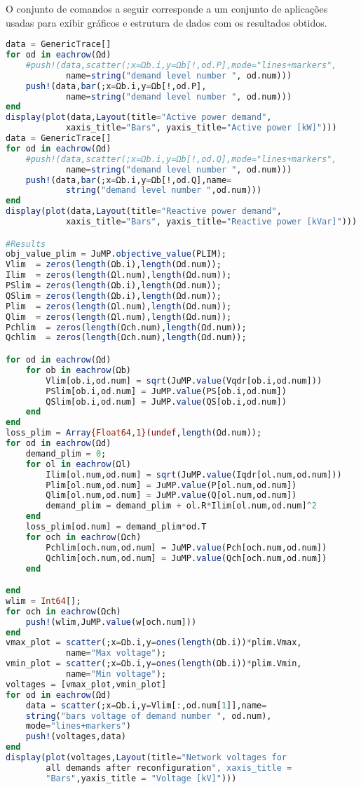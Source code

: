 O conjunto de comandos a seguir corresponde a um conjunto de aplicações usadas para exibir gráficos e estrutura de dados com os resultados obtidos.

\begin{lstlisting}[language = Julia, firstnumber = 137]
data = GenericTrace[]
for od in eachrow(Ωd)
    #push!(data,scatter(;x=Ωb.i,y=Ωb[!,od.P],mode="lines+markers",
            name=string("demand level number ", od.num)))
    push!(data,bar(;x=Ωb.i,y=Ωb[!,od.P],
            name=string("demand level number ", od.num)))
end
display(plot(data,Layout(title="Active power demand", 
            xaxis_title="Bars", yaxis_title="Active power [kW]")))
data = GenericTrace[]
for od in eachrow(Ωd)
    #push!(data,scatter(;x=Ωb.i,y=Ωb[!,od.Q],mode="lines+markers",
            name=string("demand level number ", od.num)))
    push!(data,bar(;x=Ωb.i,y=Ωb[!,od.Q],name=
            string("demand level number ",od.num)))
end
display(plot(data,Layout(title="Reactive power demand", 
            xaxis_title="Bars", yaxis_title="Reactive power [kVar]")))

#Results
obj_value_plim = JuMP.objective_value(PLIM);
Vlim  = zeros(length(Ωb.i),length(Ωd.num));   
Ilim  = zeros(length(Ωl.num),length(Ωd.num));
PSlim = zeros(length(Ωb.i),length(Ωd.num));   
QSlim = zeros(length(Ωb.i),length(Ωd.num));
Plim  = zeros(length(Ωl.num),length(Ωd.num)); 
Qlim  = zeros(length(Ωl.num),length(Ωd.num));
Pchlim  = zeros(length(Ωch.num),length(Ωd.num)); 
Qchlim  = zeros(length(Ωch.num),length(Ωd.num));

for od in eachrow(Ωd)    
    for ob in eachrow(Ωb)
        Vlim[ob.i,od.num] = sqrt(JuMP.value(Vqdr[ob.i,od.num]))
        PSlim[ob.i,od.num] = JuMP.value(PS[ob.i,od.num])
        QSlim[ob.i,od.num] = JuMP.value(QS[ob.i,od.num])
    end
end
loss_plim = Array{Float64,1}(undef,length(Ωd.num));
for od in eachrow(Ωd)
    demand_plim = 0;
    for ol in eachrow(Ωl)
        Ilim[ol.num,od.num] = sqrt(JuMP.value(Iqdr[ol.num,od.num]))
        Plim[ol.num,od.num] = JuMP.value(P[ol.num,od.num])
        Qlim[ol.num,od.num] = JuMP.value(Q[ol.num,od.num])
        demand_plim = demand_plim + ol.R*Ilim[ol.num,od.num]^2
    end
    loss_plim[od.num] = demand_plim*od.T
    for och in eachrow(Ωch)
        Pchlim[och.num,od.num] = JuMP.value(Pch[och.num,od.num])
        Qchlim[och.num,od.num] = JuMP.value(Qch[och.num,od.num])
    end

end
wlim = Int64[];
for och in eachrow(Ωch)
    push!(wlim,JuMP.value(w[och.num]))
end
vmax_plot = scatter(;x=Ωb.i,y=ones(length(Ωb.i))*plim.Vmax,
            name="Max voltage");
vmin_plot = scatter(;x=Ωb.i,y=ones(length(Ωb.i))*plim.Vmin,
            name="Min voltage");
voltages = [vmax_plot,vmin_plot]
for od in eachrow(Ωd)
    data = scatter(;x=Ωb.i,y=Vlim[:,od.num[1]],name= 
    string("bars voltage of demand number ", od.num),
    mode="lines+markers")
    push!(voltages,data)
end
display(plot(voltages,Layout(title="Network voltages for 
        all demands after reconfiguration", xaxis_title = 
        "Bars",yaxis_title = "Voltage [kV]")))
\end{lstlisting}

